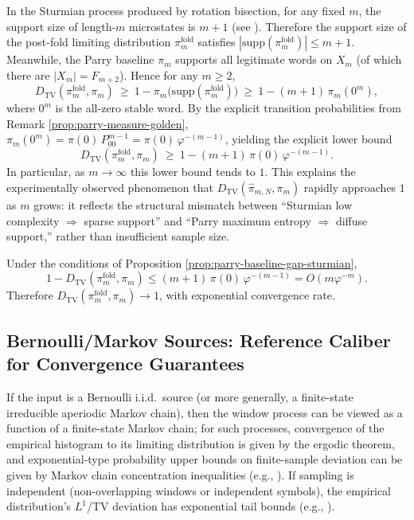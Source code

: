 \begin{proposition}\label{prop:parry-baseline-gap-sturmian}
In the Sturmian process produced by rotation bisection, for any fixed $m$, the support size of length-$m$ microstates is $m+1$ (see \cite{MorseHedlund1940,LindMarcus1995}). Therefore the support size of the post-fold limiting distribution $\pi_m^{\mathrm{fold}}$ satisfies
\(
|\mathrm{supp}(\pi_m^{\mathrm{fold}})|\le m+1
\).
Meanwhile, the Parry baseline $\pi_m$ supports all legitimate words on $X_m$ (of which there are $|X_m|=F_{m+2}$). Hence for any $m\ge 2$,
\[
D_{\mathrm{TV}}(\pi_m^{\mathrm{fold}},\pi_m)\ \ge\ 1-\pi_m\bigl(\mathrm{supp}(\pi_m^{\mathrm{fold}})\bigr)
\ \ge\ 1-(m+1)\,\pi_m(0^m),
\]
where $0^m$ is the all-zero stable word. By the explicit transition probabilities from Remark \ref{prop:parry-measure-golden},
\(
\pi_m(0^m)=\pi(0)\,P_{00}^{m-1}=\pi(0)\,\varphi^{-(m-1)}
\),
yielding the explicit lower bound
\[
D_{\mathrm{TV}}(\pi_m^{\mathrm{fold}},\pi_m)\ \ge\ 1-(m+1)\,\pi(0)\,\varphi^{-(m-1)}.
\]
In particular, as $m\to\infty$ this lower bound tends to $1$. This explains the experimentally observed phenomenon that $D_{\mathrm{TV}}(\hat{\pi}_{m,N},\pi_m)$ rapidly approaches $1$ as $m$ grows: it reflects the structural mismatch between ``Sturmian low complexity $\Rightarrow$ sparse support'' and ``Parry maximum entropy $\Rightarrow$ diffuse support,'' rather than insufficient sample size.
\end{proposition}

\begin{corollary}\label{cor:parry-gap-exp}
Under the conditions of Proposition \ref{prop:parry-baseline-gap-sturmian},
\[
1-D_{\mathrm{TV}}(\pi_m^{\mathrm{fold}},\pi_m)
\le (m+1)\,\pi(0)\,\varphi^{-(m-1)}
=O(m\varphi^{-m}).
\]
Therefore $D_{\mathrm{TV}}(\pi_m^{\mathrm{fold}},\pi_m)\to 1$, with exponential convergence rate.
\end{corollary}

\subsection{Bernoulli/Markov Sources: Reference Caliber for Convergence Guarantees}

\begin{remark}\label{rem:bernoulli-source-guarantee}
If the input is a Bernoulli i.i.d.\ source (or more generally, a finite-state irreducible aperiodic Markov chain), then the window process can be viewed as a function of a finite-state Markov chain; for such processes, convergence of the empirical histogram to its limiting distribution is given by the ergodic theorem, and exponential-type probability upper bounds on finite-sample deviation can be given by Markov chain concentration inequalities (e.g., \cite{Paulin2015MarkovConcentration}). If sampling is independent (non-overlapping windows or independent symbols), the empirical distribution's $L^1$/TV deviation has exponential tail bounds (e.g., \cite{WeissmanEtAl2003L1Empirical}).
\end{remark}

